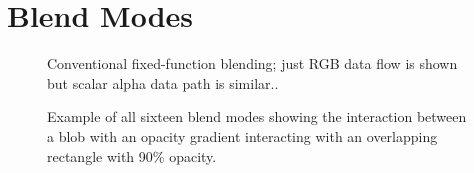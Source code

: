 
\section{Blend Modes}
\label{sec:blendmodes}



\ifdefined\NOSHOW
\begin{figure}[tb]
  \caption{\label{fig:fixedfunction-blending}
  Conventional fixed-function blending; just RGB data flow is shown but scalar alpha data path is similar..}
\end{figure}
\fi


\begin{figure}[tb]
  \caption{\label{fig:blendmode-example} Example of all sixteen blend modes showing the interaction between a blob with an opacity gradient interacting with an overlapping rectangle with 90\% opacity.}
\end{figure}

